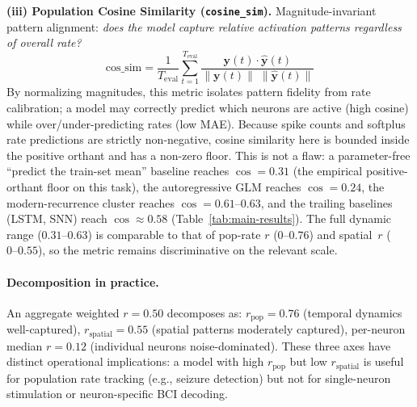 \documentclass{article}
\begin{document}
\textbf{(iii) Population Cosine Similarity (\texttt{cosine\_sim}).}
Magnitude-invariant pattern alignment: \emph{does the model capture
relative activation patterns regardless of overall rate?}
\begin{equation}
  \mathrm{cos\_sim} = \frac{1}{T_\mathrm{eval}}
  \sum_{t=1}^{T_\mathrm{eval}}
  \frac{\mathbf{y}(t) \cdot \hat{\mathbf{y}}(t)}
       {\|\mathbf{y}(t)\| \;\|\hat{\mathbf{y}}(t)\|}
  \label{eq:cosine}
\end{equation}
By normalizing magnitudes, this metric isolates pattern fidelity from
rate calibration; a model may correctly predict which neurons are
active (high cosine) while over/under-predicting rates (low MAE).
Because spike counts and softplus rate predictions are strictly
non-negative, cosine similarity here is bounded inside the positive
orthant and has a non-zero floor.  This is not a flaw: a parameter-free
``predict the train-set mean'' baseline reaches $\cos{=}0.31$ (the
empirical positive-orthant floor on this task), the autoregressive
GLM reaches $\cos{=}0.24$, the modern-recurrence cluster reaches
$\cos{=}0.61\text{--}0.63$, and the trailing baselines (LSTM, SNN)
reach $\cos{\approx}0.58$ (Table~\ref{tab:main-results}).  The full
dynamic range ($0.31\text{--}0.63$) is comparable to that of pop-rate
$r$ ($0\text{--}0.76$) and spatial~$r$ ($0\text{--}0.55$), so the
metric remains discriminative on the relevant scale.

\paragraph{Decomposition in practice.}
An aggregate weighted $r = 0.50$ decomposes as:
$r_\mathrm{pop} = 0.76$ (temporal dynamics well-captured),
$r_\mathrm{spatial} = 0.55$ (spatial patterns moderately captured),
per-neuron median $r = 0.12$ (individual neurons noise-dominated).
These three axes have distinct operational implications:
a model with high $r_\mathrm{pop}$ but low $r_\mathrm{spatial}$ is
useful for population rate tracking (e.g., seizure detection) but not
for single-neuron stimulation or neuron-specific BCI decoding.
\end{document}
